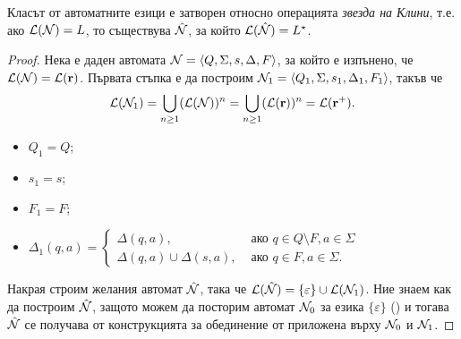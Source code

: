 \begin{lemma}
  \label{lem:kleene-star}
  Класът от автоматните езици е затворен относно операцията {\em звезда на Клини}, т.е.
  ако $\mathcal{L}(\mathcal{N}) = L$, то съществува $\hat{\mathcal{N}}$, за който $\mathcal{L}(\hat{\mathcal{N}}) = L^\star$.
\end{lemma}
\begin{proof}
  Нека е даден автомата $\mathcal{N} = \langle{Q,\Sigma,s,\Delta,F}\rangle$, за който е изпънено, че
  $\mathcal{L}(\mathcal{N}) = \mathcal{L}(\mathbf{r})$.
  Първата стъпка е да построим $\mathcal{N}_1 = \langle{Q_1,\Sigma,s_1,\Delta_1,F_1}\rangle$, такъв че 
  \[\mathcal{L}(\mathcal{N}_1) = \bigcup_{n\geq 1} (\mathcal{L}(\mathcal{N}))^n = \bigcup_{n\geq 1} (\mathcal{L}(\mathbf{r}))^n = \mathcal{L}(\mathbf{r^+}).\]
  \begin{itemize}
  \item
    $Q_1 = Q$;
  \item
    $s_1 = s$;
  \item
    $F_1 = F$;
  \item
    $\Delta_1(q,a) = 
    \begin{cases}
      \Delta(q,a), & \text{ ако } q\in Q\setminus F, a \in \Sigma\\
      \Delta(q,a) \cup \Delta(s,a), & \text{ ако } q\in F, a\in\Sigma.
    \end{cases}$
  \end{itemize}
  Накрая строим желания автомат $\hat{\mathcal{N}}$, така че $\mathcal{L}(\hat{\mathcal{N}}) = \{\varepsilon\} \cup \mathcal{L}(\mathcal{N}_1)$.
  Ние знаем как да построим $\hat{\mathcal{N}}$, защото можем да посторим автомат $\mathcal{N}_0$ за езика $\{\varepsilon\}$
  () и тогава $\hat{\mathcal{N}}$ се получава от конструкцията за обединение от  приложена върху $\mathcal{N}_0$ и $\mathcal{N}_1$.
\end{proof}


